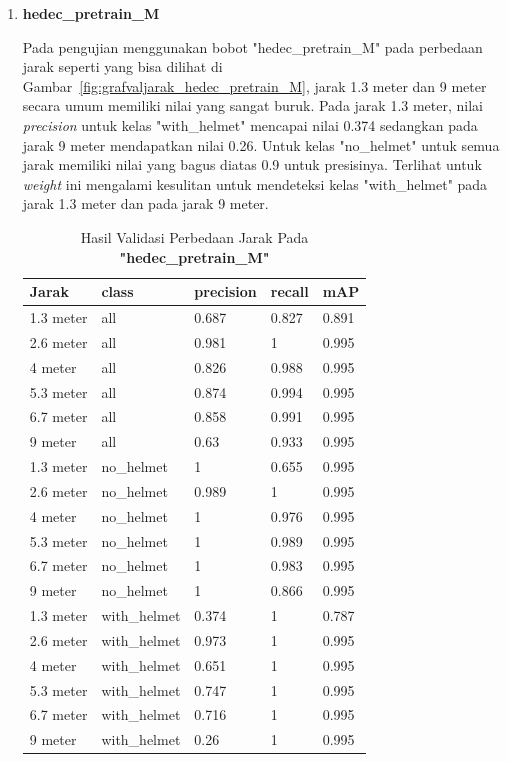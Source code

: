 \begin{enumerate}
  \FloatBarrier
  
   
  \item \textbf{hedec\_pretrain\_M}
  
  \par Pada pengujian menggunakan bobot "hedec\_pretrain\_M" pada perbedaan jarak seperti yang bisa dilihat di Gambar~\ref{fig:grafvaljarak_hedec_pretrain_M}, jarak 1.3 meter dan 9 meter
  secara umum memiliki nilai yang sangat buruk. Pada jarak 1.3 meter, nilai \emph{precision} untuk kelas "with\_helmet"
  mencapai nilai 0.374 sedangkan pada jarak 9 meter mendapatkan nilai 0.26. Untuk kelas "no\_helmet" untuk semua jarak memiliki
  nilai yang bagus diatas 0.9 untuk presisinya. Terlihat untuk \emph{weight} ini mengalami kesulitan untuk mendeteksi
  kelas "with\_helmet" pada jarak 1.3 meter dan pada jarak 9 meter.


  \begin{longtable}{|l|l|l|l|l|} 
    \caption{Hasil Validasi Perbedaan Jarak Pada \textbf{"hedec\_pretrain\_M"}}
    \label{tb:hasiljarak_hedec_pretrain_M}\\
    \hline
    Jarak     & class        & precision & recall & mAP    \\ 
    \hline
    1.3 meter & all          & 0.687     & 0.827  & 0.891  \\
    2.6 meter & all          & 0.981     & 1      & 0.995  \\
    4 meter   & all          & 0.826     & 0.988  & 0.995  \\
    5.3 meter & all          & 0.874     & 0.994  & 0.995  \\
    6.7 meter & all          & 0.858     & 0.991  & 0.995  \\
    9 meter   & all          & 0.63      & 0.933  & 0.995  \\
    1.3 meter & no\_helmet   & 1         & 0.655  & 0.995  \\
    2.6 meter & no\_helmet   & 0.989     & 1      & 0.995  \\
    4 meter   & no\_helmet   & 1         & 0.976  & 0.995  \\
    5.3 meter & no\_helmet   & 1         & 0.989  & 0.995  \\
    6.7 meter & no\_helmet   & 1         & 0.983  & 0.995  \\
    9 meter   & no\_helmet   & 1         & 0.866  & 0.995  \\
    1.3 meter & with\_helmet & 0.374     & 1      & 0.787  \\
    2.6 meter & with\_helmet & 0.973     & 1      & 0.995  \\
    4 meter   & with\_helmet & 0.651     & 1      & 0.995  \\
    5.3 meter & with\_helmet & 0.747     & 1      & 0.995  \\
    6.7 meter & with\_helmet & 0.716     & 1      & 0.995  \\
    9 meter   & with\_helmet & 0.26      & 1      & 0.995  \\
    \hline
  \end{longtable}


\end{enumerate}
